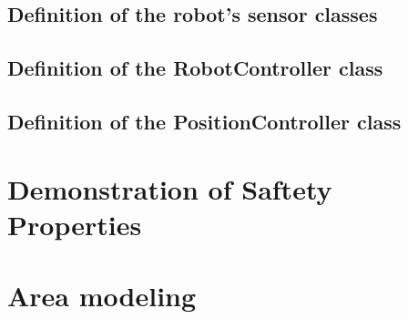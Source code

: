\documentclass[a4paper]{article}
\begin{document}
\pagebreak
\subsection{Definition of the robot's sensor classes}


\pagebreak

\pagebreak


\pagebreak
\subsection{Definition of the RobotController class}


\pagebreak
\subsection{Definition of the PositionController class}



\pagebreak
\section{Demonstration of Saftety Properties}



\pagebreak
\appendix
\section{Area modeling}
\end{document}
